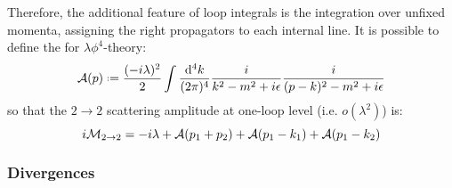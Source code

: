 Therefore, the additional feature of loop integrals is the integration over unfixed momenta, assigning the right propagators to each internal line. It is possible to define the  for $ \lambda \phi^4 $-theory:
\begin{equation}
  \mathcal{A}(p) \defeq \frac{(-i \lambda)^2}{2} \int \frac{\dd^4k}{(2\pi)^4} \frac{i}{k^2 - m^2 + i \epsilon} \frac{i}{(p - k)^2 - m^2 + i \epsilon}
  \label{eq:f4-loop-ampl}
\end{equation}
so that the $ 2 \rightarrow 2 $ scattering amplitude at one-loop level (i.e. $ o(\lambda^2) $) is:
\begin{equation}
  i \mathcal{M}_{2 \rightarrow 2} = -i \lambda + \mathcal{A}(p_1 + p_2) + \mathcal{A}(p_1 - k_1) + \mathcal{A}(p_1 - k_2)
\end{equation}

\subsubsection{Divergences}

